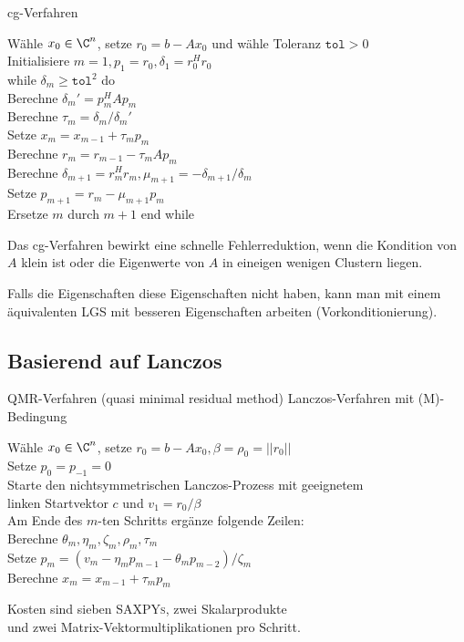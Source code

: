 \begin{karte}{cg-Verfahren}
    \begin{tabbing}
        Wähle \( x_0 \in \C^n \), setze \(r_0 = b - A x_0\) und wähle Toleranz \(\texttt{tol} > 0\) \\
        Initialisiere \(m = 1, p_1 = r_0, \delta_1 = r_0^H r_0\) \\
        while \= \(\delta_m \geq \texttt{tol}^2 \) do \\
        \> Berechne \(\delta_m' = p_m^H A p_m\) \\
        \> Berechne \(\tau_m = \delta_m / \delta_m'\) \\
        \> Setze \(x_m = x_{m-1} + \tau_m p_m\) \\
        \> Berechne \(r_m = r_{m-1} - \tau_m A p_m\) \\
        \> Berechne \( \delta_{m+1} = r_m^H r_m, \mu_{m+1} = -\delta_{m+1}/\delta_m \) \\
        \> Setze \( p_{m+1} = r_m - \mu_{m+1} p_m \) \\
        \> Ersetze \(m\) durch \(m+1\) 
        end while
    \end{tabbing}
    Das cg-Verfahren bewirkt eine schnelle Fehlerreduktion, 
    wenn die Kondition von \(A\) klein ist oder die Eigenwerte 
    von \(A\) in eineigen wenigen Clustern liegen.

    Falls die Eigenschaften diese Eigenschaften nicht haben, 
    kann man mit einem äquivalenten LGS mit besseren Eigenschaften 
    arbeiten (Vorkonditionierung).
\end{karte}

\subsection{Basierend auf Lanczos}

\begin{karte}{QMR-Verfahren (quasi minimal residual method)}
    Lanczos-Verfahren mit (M)-Bedingung
    \begin{tabbing}
        Wähle \( x_0 \in \C^n \), setze \(r_0 = b - A x_0, \beta = \rho_0 = ||r_0||\) \\
        Setze \( p_0 = p_{-1} = 0 \)  \\
        Starte den nichtsymmetrischen Lanczos-Prozess mit geeignetem \\
        linken Startvektor \(c\) und \(v_1 = r_0/\beta\) \\
        Am Ende \= des \(m\)-ten Schritts ergänze folgende Zeilen:\\
        \> Berechne \( \theta_m, \eta_m, \zeta_m, \rho_m, \tau_m \) \\
        \> Setze \( p_m = (v_m - \eta_m p_{m-1} - \theta_m p_{m-2})/\zeta_m \) \\
        \> Berechne \( x_m = x_{m-1} + \tau_m p_m \)
    \end{tabbing}
    Kosten sind sieben \textsc{SAXPYs}, zwei Skalarprodukte \\
    und zwei Matrix-Vektormultiplikationen pro Schritt.
\end{karte}

